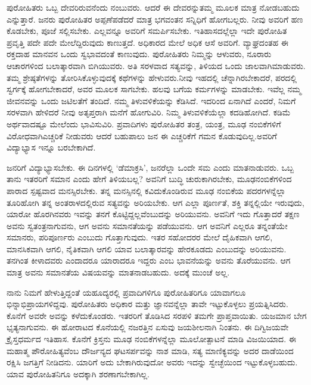 ಪುರೋಹಿತರು ಒಬ್ಬ ದೇವರಿರುವನೆಂದು ನಂಬುವರು. ಆದರೆ ಈ ದೇವರನ್ನು\break ತಮ್ಮ ಮೂಲಕ ಮಾತ್ರ ನೋಡಬಹುದು ಎನ್ನುತ್ತಾರೆ. ಜನರು ಪುರೋಹಿತರ ಅಪ್ಪಣೆ\break ಪಡೆದರೆ ಮಾತ್ರ ಭಗವಂತನ ಸನ್ನಿಧಿಗೆ ಹೋಗಬಲ್ಲರು. ನೀವು ಅವರಿಗೆ ಹಣ ಕೊಡಬೇಕು, ಪೂಜೆ ಸಲ್ಲಿಸಬೇಕು. ಎಲ್ಲವನ್ನೂ ಅವರಿಗೆ ಸಮರ್ಪಿಸಬೇಕು. ಇತಿಹಾಸದಲ್ಲೆಲ್ಲಾ ಇದೇ ಪುರೋಹಿತ ಪ್ರವೃತ್ತಿ ಪದೇ ಪದೇ ಮೇಲೆದ್ದಿರುವುದು ಕಾಣುತ್ತದೆ. ಅಧಿಕಾರದ ಮೇಲೆ ಅಧಿಕ ಆಸೆ ಅವರಿಗೆ. ವ್ಯಾಘ್ರದಂತಹ ಈ ರಕ್ತದಾಹ ಮಾನವನ ಒಂದು ಸ್ವಭಾವದಂತೆ ಕಾಣುವುದು. ಪುರೋಹಿತರು ನಿಮ್ಮನ್ನು ಆಳುವರು, ನೂರಾರು ಆಚಾರಗಳಿಂದ ಬಲಾತ್ಕಾರವಾಗಿ ಬಿಗಿಯುವರು. ಅತಿ ಸರಳವಾದ ಸತ್ಯವನ್ನು, ತಿಳಿಯದ ಒಂದು ಜಾಲವಾಗಿ\break ಮಾಡುವರು. ತಮ್ಮ ಶ್ರೇಷ್ಠತೆಗಳನ್ನು ತೋರಿಸಿಕೊಳ್ಳುವುದಕ್ಕೆ ಕಥೆಗಳನ್ನು ಹೇಳುವರು.\break ನೀವು ಇಹದಲ್ಲಿ ಚೆನ್ನಾಗಿರಬೇಕಾದರೆ, ಪರದಲ್ಲಿ ಸ್ವರ್ಗಕ್ಕೆ ಹೋಗಬೇಕಾದರೆ, ಅವರ ಮೂಲಕ ಸಾಗಬೇಕು. ಹಲವು ಬಗೆಯ ಕರ್ಮಗಳನ್ನು ಮಾಡಬೇಕು. ಇವೆಲ್ಲ ನಮ್ಮ ಜೀವನವನ್ನು ಒಂದು ಜಟಿ\-ಲತೆಗೆ ತಂದಿದೆ. ನಮ್ಮ ತಿಳುವಳಿಕೆಯನ್ನು ಕೆಡಿಸಿದೆ. ಇದರಿಂದ ಏನಾಗಿದೆ ಎಂದರೆ, ನಿಮಗೆ ಸರಳವಾಗಿ ಹೇಳಿದರೆ ನೀವು ಅತೃಪ್ತರಾಗಿ ಮನೆಗೆ ಹೋಗುವಿರಿ. ನಿಮ್ಮ ತಿಳುವಳಿಕೆಯೆಲ್ಲಾ ಕದಡಿಹೋಗಿದೆ. ಕಡಿಮೆ ಅರ್ಥವಾದಷ್ಟೂ ಮೇಲೆಂದು ಭಾವಿಸುವಿರಿ. ಪ್ರವಾದಿಗಳು ಪುರೋಹಿತರ ತಂತ್ರ, ಯಂತ್ರ, ಮೂಢ ನಂಬಿಕೆಗಳಿಗೆ ವಿರೋಧವಾಗಿ\break ಎಚ್ಚರಿಕೆ ನೀಡುವರು ಆದರೆ ಬಹುಪಾಲು ಜನ ಈ ಎಚ್ಚರಿಕೆಗೆ ಗಮನ ಕೊಡುವುದಿಲ್ಲ.\break ಅವರಿಗೆ ವಿದ್ಯಾಭ್ಯಾಸ ಇನ್ನೂ ಬರಬೇಕಾಗಿದೆ.

\newpage

ಜನರಿಗೆ ವಿದ್ಯಾಭ್ಯಾಸಬೇಕು. ಈ ದಿನಗಳಲ್ಲಿ ‘ಡೆಮಾಕ್ರಸಿ’, ಜನರೆಲ್ಲಾ ಒಂದೇ ಸಮ ಎಂದು ಮಾತನಾಡುವರು. ಒಬ್ಬ ತಾನು ಇತರರಿಗೆ ಸಮಾನ ಎಂದು ಹೇಗೆ ತಿಳಿಯಬಲ್ಲ? ಅವನಿಗೆ ಬುದ್ಧಿ ಚುರುಕಾಗಿರಬೇಕು, ಮೂಢನಂಬಿಕೆಗಳಿಂದ ಪಾರಾದ ಸ್ಪಷ್ಟವಾದ ಮನಸ್ಸಿರಬೇಕು. ತನ್ನ ಮನಸ್ಸಿನಲ್ಲಿ ಕವಿದುಕೊಂಡಿರುವ ಮೂಢ ನಂಬಿಕೆಯ ಪದರಗಳನ್ನೆಲ್ಲಾ ತೂರಿಹೋಗಿ ತನ್ನ ಅಂತರಾಳದಲ್ಲಿರುವ ಸತ್ಯವನ್ನು ಅರಿಯಬೇಕು. ಆಗ ಎಲ್ಲಾ ಪೂರ್ಣತೆ, ಶಕ್ತಿ ತನ್ನಲ್ಲಿಯೇ ಇರುವುದು, ಯಾರೋ ಹೊರಗಿನವರು ಇವನ್ನು ತನಗೆ ಕೊಟ್ಟಿದ್ದಲ್ಲವೆಂಬುದನ್ನು ಅರಿಯುವನು. ಅವನಿಗೆ ಇದು ಗೊತ್ತಾದರೆ ತಕ್ಷಣ ಅವನು ಸ್ವತಂತ್ರನಾಗುವನು, ಆಗ ಅವನು ಸಮಾನತೆಯನ್ನು ಪಡೆಯುವನು. ಆಗ ಅವನಿಗೆ ಎಲ್ಲರೂ ತನ್ನಂತೆಯೇ ಸಮಾನರು, ಪರಿಪೂರ್ಣರು ಎಂಬುದು ಗೊತ್ತಾಗುವುದು. ಇತರ ಸಹೋದರರ ಮೇಲೆ ದೈಹಿಕವಾಗಿ ಆಗಲಿ, ಮಾನಸಿಕವಾಗಿ ಆಗಲಿ, ನೈತಿಕವಾಗಿ ಆಗಲಿ ಯಾವ ಬಲಾತ್ಕಾರವನ್ನು ಹೇರಕೂಡದು ಎಂಬುದನ್ನು ಅರಿಯುವನು. ತನಗಿಂತ ಕೀಳಾದವರು ಎಂದಾದರೂ ಯಾರಾದರೂ ಇದ್ದರು ಎಂಬ ಭಾವನೆಯನ್ನು ಅವನು ತೊರೆಯುವನು. ಆಗ ಮಾತ್ರ ಅವನು ಸಮಾನತೆಯ ವಿಷಯವನ್ನು ಮಾತನಾಡಬಹುದು. ಅದಕ್ಕೆ ಮುಂಚೆ ಅಲ್ಲ.

ನಾನು ನಿಮಗೆ ಹೇಳುತ್ತಿದ್ದಂತೆ ಯಹೂದ್ಯರಲ್ಲಿ ಪ್ರವಾದಿಗಳಿಗೂ ಪುರೋಹಿತರಿಗೂ ಯಾವಾಗಲೂ ಭಿನ್ನಾಭಿಪ್ರಾಯಗಳಿದ್ದವು. ಪುರೋಹಿತರು ಅಧಿಕಾರ ಮತ್ತು ಜ್ಞಾನವನ್ನೆಲ್ಲಾ ತಾವೇ ಇಟ್ಟುಕೊಳ್ಳಲು ಪ್ರಯತ್ನಿಸಿದರು. ಕೊನೆಗೆ ಅವರೇ ಅವನ್ನು ಕಳೆದುಕೊಂಡರು. ಇತರರಿಗೆ ತೊಡಿಸಿದ ಸರಪಳಿ ತಮಗೇ ಪ್ರಾಪ್ತವಾಯಿತು. ಯಜಮಾನ ಬೇಗ ಭೃತ್ಯನಾಗುವನು. ಈ ಹೋರಾಟದ ಕೊನೆಯಲ್ಲಿ ನಜರತ್ತಿನ ಏಸುವು ಜಯಶೀಲನಾಗಿ ನಿಂತನು. ಈ ದಿಗ್ವಿಜಯವೇ ಕ್ರೈಸ್ತಧರ್ಮದ ಇತಿಹಾಸ. ಕೊನೆಗೆ ಕ್ರಿಸ್ತನು ಮೂಢ ನಂಬಿಕೆಗಳನ್ನೆಲ್ಲಾ ಮೂಲೋತ್ಪಾಟನೆ ಮಾಡಿ ವಿಜಯಿಯಾದ. ಈ ಮಹಾತ್ಮ ಪೌರೋಹಿತ್ಯವೆಂಬ ದೌರ್ಜನ್ಯದ ಘಟಸರ್ಪವನ್ನು ನಾಶ ಮಾಡಿ, ಸತ್ಯ ಮಾಣಿಕ್ಯವನ್ನು ಅದರ ದಾಡೆಯಿಂದ ರಕ್ಷಿಸಿ ಜಗತ್ತಿಗೆ ನೀಡಿದನು. ಯಾರಿಗೆ ಅದು ಬೇಕಾಗಿರುವುದೋ ಅವರು ಇದನ್ನು ಸ್ವೇಚ್ಛೆಯಿಂದ ಇಟ್ಟುಕೊಳ್ಳಬಹುದು. ಯಾವ ಪುರೋಹಿತನಿಗೂ ಅದಕ್ಕಾಗಿ ಶರಣಾಗಬೇಕಾಗಿಲ್ಲ.

